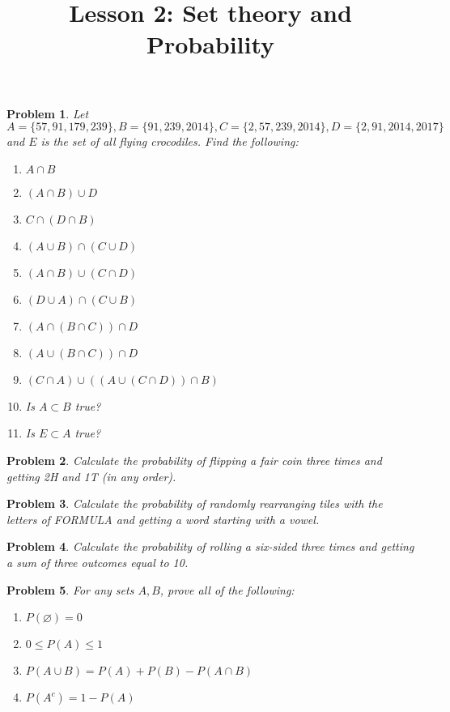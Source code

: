 \documentclass[a4paper,12pt]{article}
\title{Lesson 2: Set theory and Probability }
\theoremstyle{perfect}
\newtheorem{prb}{Problem}
\begin{document}
 
\maketitle

\begin{prb}
Let $A = \{57, 91, 179, 239\}, B = \{91, 239, 2014\}, C = \{2, 57, 239, 2014\},
D = \{2, 91, 2014, 2017\}$ and $E$ is the set of all flying crocodiles. 
Find the following:
\begin{enumerate}
\item  $A \cap B$
\item $(A \cap B) \cup D$
\item $C \cap (D \cap B)$
\item $(A \cup B) \cap (C \cup D)$
\item $(A \cap B) \cup (C \cap D)$ 
\item $(D \cup A) \cap (C \cup B)$ 
\item $(A \cap (B \cap C)) \cap D$
\item $(A \cup (B \cap C)) \cap D$
\item $(C \cap A) \cup ((A \cup (C \cap D)) \cap B)$
\item Is $A \subset B$ true?
\item Is $E \subset A$ true?
\end{enumerate}

\end{prb}

\begin{prb}
Calculate the probability of flipping a fair coin three times and getting 2H and 1T (in any order).
\end{prb} 

\begin{prb}
Calculate the probability of randomly rearranging tiles with the letters of FORMULA and getting a word starting with a vowel.
\end{prb} 

\begin{prb}
Calculate the probability of rolling a six-sided three times and getting a sum of three outcomes equal to 10.
\end{prb} 

\begin{prb}
For any sets $A, B$, prove all of the following:
\begin{enumerate}
\item $P(\varnothing) = 0$
\item $0 \leq P(A) \leq 1$
\item $P(A \cup B) = P(A) + P(B) - P(A \cap B)$
\item $P(A^c) = 1 - P(A)$
\end{enumerate}
\end{prb}
\end{document}

